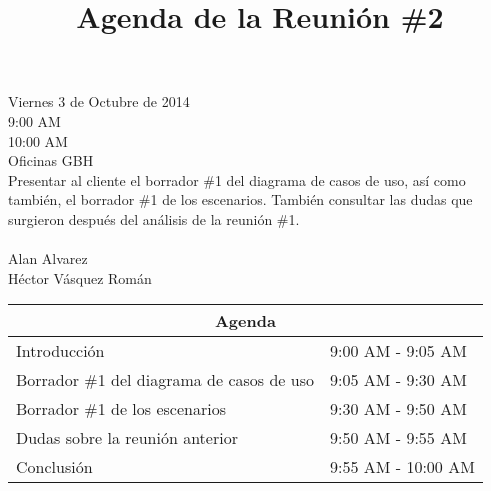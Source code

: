 \documentclass{article}
\begin{document}
\title{\bfseries Agenda de la Reuni\'{o}n \#2}
\date{}
\maketitle

 Viernes 3 de Octubre de 2014\\
 9:00 AM\\
 10:00 AM\\
 Oficinas GBH\\[0.3in]
 Presentar al cliente el borrador \#1 del diagrama de casos de uso, as\'{i} como tambi\'{e}n, el borrador \#1 de los
escenarios. Tambi\'{e}n consultar las dudas que surgieron despu\'{e}s del an\'{a}lisis de la reuni\'{o}n \#1.\\[0.3in]
\\
\indent Alan Alvarez\\
\indent H\'{e}ctor V\'{a}squez Rom\'{a}n\\[0.3in]    
\begin{center}
    \begin{tabular}{|l|l|}
        \hline
        \multicolumn{2}{|c|}{\bfseries Agenda}\\
        \hline
        Introducci\'{o}n&9:00 AM - 9:05 AM\\
        \hline
        Borrador \#1 del diagrama de casos de uso&9:05 AM - 9:30 AM\\
        \hline
        Borrador \#1 de los escenarios&9:30 AM - 9:50 AM\\
        \hline
        Dudas sobre la reuni\'{o}n anterior&9:50 AM - 9:55 AM\\
        \hline
        Conclusi\'{o}n&9:55 AM - 10:00 AM\\
        \hline
    \end{tabular}
\end{center}
\end{document}
